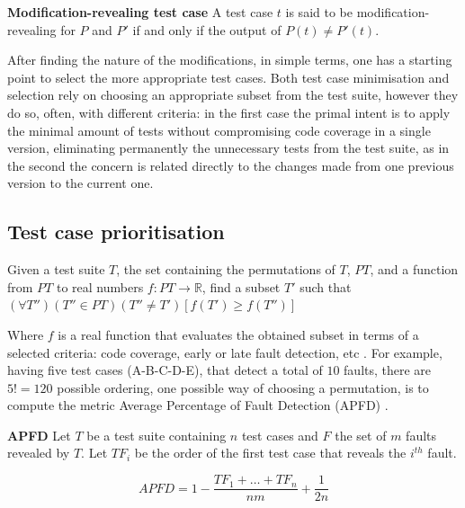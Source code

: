 \theoremstyle{definition}
\begin{definition}{\textbf{Modification-revealing test case}}
	A test case $t$ is said to be modification-revealing for $P$ and $P'$ if and only if the output of $P(t) \neq P'(t)$. \cite{Rothermel:1994:FER:257734.257767}
\end{definition}

After finding the nature of the modifications, in simple terms, one has a starting point to select the more appropriate test cases. Both test case minimisation and selection rely on choosing an appropriate subset from the test suite, however they do so, often, with different criteria: in the first case the primal intent is to apply the minimal amount of tests without compromising code coverage in a single version, eliminating permanently the unnecessary tests from the test suite, as in the second the concern is related directly to the changes made from one previous version to the current one. \cite{ShinThesis} 

\subsection{Test case prioritisation}

\theoremstyle{definition}
\begin{definition}{}
	Given a test suite $T$, the set containing the permutations of $T$, $PT$, and a function from $PT$ to real numbers $f : PT \rightarrow \mathbb{R}$, find a subset $T'$ such that $(\forall T'')(T'' \in PT)(T'' \neq T')[f(T') \ge f(T'')] $ 
\end{definition}

Where $f$ is a real function that evaluates the obtained subset in terms of a selected criteria: code coverage, early or late fault detection, etc \cite{ShinThesis}. For example, having five test cases (A-B-C-D-E), that detect a total of $10$ faults, there are $5! = 120$ possible ordering, one possible way of choosing a permutation, is to compute the metric Average Percentage of Fault Detection (APFD) \cite{APFD}. 

\theoremstyle{definition}
\begin{definition}{\textbf{APFD}}
	Let $T$ be a test suite containing $n$ test cases and $F$ the set of $m$ faults revealed by $T$. Let $TF_i$ be the order of the first test case that reveals the $i^{th}$ fault.\cite{ShinThesis}
\end{definition}

\begin{equation*}
APFD = 1 - \frac{TF_{1}+\dots+TF_{n}}{nm} + \frac{1}{2n}
\end{equation*}

